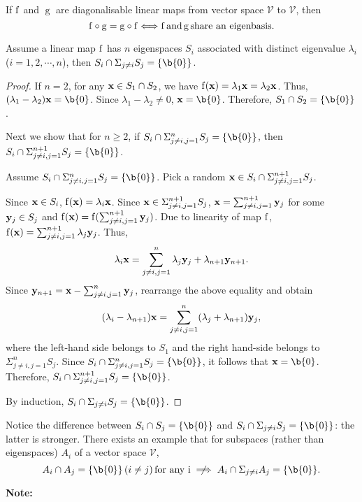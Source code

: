 \begin{corollary}
If $\operatorname{f}$ and $\operatorname{g}$ are diagonalisable linear maps from vector space $\mathcal{V}$ to $\mathcal{V}$, then
$$\operatorname{f\circ g} = \operatorname{g \circ f} \Longleftrightarrow 
\operatorname{f} \textnormal{and} \operatorname{g} \textnormal{share an eigenbasis.}$$
\end{corollary}


\begin{lemma}\label{lemma:capeigenspace0}
Assume a linear map $\operatorname{f}$ has $n$ eigenspaces $S_i$ associated with distinct eigenvalue $\lambda_i$ ($i = 1, 2, \cdots, n$), then $S_i \cap \Sigma_{j \neq i} S_j = \{\b{0}\}$.
\end{lemma}


\begin{proof}
If $n = 2$, for any $\mathbf{x} \in S_1 \cap S_2$, we have $\operatorname{f}(\mathbf{x}) = \lambda_1 \mathbf{x} = \lambda_2 \mathbf{x}$. 
Thus, $(\lambda_1 - \lambda_2) \x = \b{0}$. 
Since $\lambda_1 - \lambda_2 \neq 0$, $\x = \b{0}$. Therefore, $S_1 \cap S_2 = \{\b{0}\}$.

Next we show that for $n \geq 2$, if $S_i \cap \Sigma_{j \neq i, j =1}^{n} S_j = \{\b{0}\}$, then $S_i \cap \Sigma_{j \neq i, j =1}^{n+1} S_j = \{\b{0}\}$.

Assume $S_i \cap \Sigma_{j \neq i, j =1}^{n} S_j = \{\b{0}\}$. Pick a random $\mathbf{x} \in S_i \cap \Sigma_{j \neq i, j =1}^{n+1} S_j$. 

Since $\mathbf{x} \in S_i$, $\operatorname{f}(\mathbf{x}) = \lambda_i \mathbf{x}$.
Since $\mathbf{x} \in \Sigma_{j \neq i, j =1}^{n+1} S_j$, $\mathbf{x} = \sum_{j \neq i, j =1}^{n+1} \mathbf{y}_j$ for some $\mathbf{y}_j \in S_j$ and $\operatorname{f}(\mathbf{x}) = \operatorname{f}(\sum_{j \neq i, j =1}^{n+1} \mathbf{y}_j)$. 
Due to linearity of map $\operatorname{f}$, $\operatorname{f}(\mathbf{x}) = \sum_{j \neq i, j =1}^{n+1} \lambda_j \mathbf{y}_j$. Thus, 
$$\lambda_i \mathbf{x} = \sum_{j \neq i, j =1}^{n} \lambda_j \mathbf{y}_j + \lambda_{n+1} \mathbf{y}_{n+1}.$$
Since $\mathbf{y}_{n+1} = \mathbf{x} - \sum_{j \neq i, j =1}^{n} \mathbf{y}_j$, rearrange the above equality and obtain 
$$(\lambda_i - \lambda_{n+1}) \mathbf{x} = \sum_{j \neq i, j =1}^{n} (\lambda_j + \lambda_{n+1}) \mathbf{y}_j,$$
where the left-hand side belongs to $S_1$ and the right hand-side belongs to $\Sigma_{j \neq i, j =1}^{n} S_j$.
Since $S_i \cap \Sigma_{j \neq i, j =1}^{n} S_j = \{\b{0}\}$, it follows that $\x = \b{0}$. Therefore, $S_i \cap \Sigma_{j \neq i, j =1}^{n+1} S_j = \{\b{0}\}$.

By induction, $S_i \cap \Sigma_{j \neq i} S_j = \{\b{0}\}$.
\end{proof}

\begin{warning}
Notice the difference between $S_i \cap  S_j = \{\b{0}\}$ and $S_i \cap \Sigma_{j \neq i} S_j = \{\b{0}\}$:
the latter is stronger.
There exists an example that for subspaces (rather than eigenspaces) $A_i$ of a vector space $\mathcal{V}$, 
$$A_i \cap  A_j = \{\b{0}\} \, (i \neq j) \, \textnormal{for any i} \centernot \implies A_i \cap \Sigma_{j \neq i} A_j = \{\b{0}\}.$$
\end{warning}
\textbf{Note:} 






